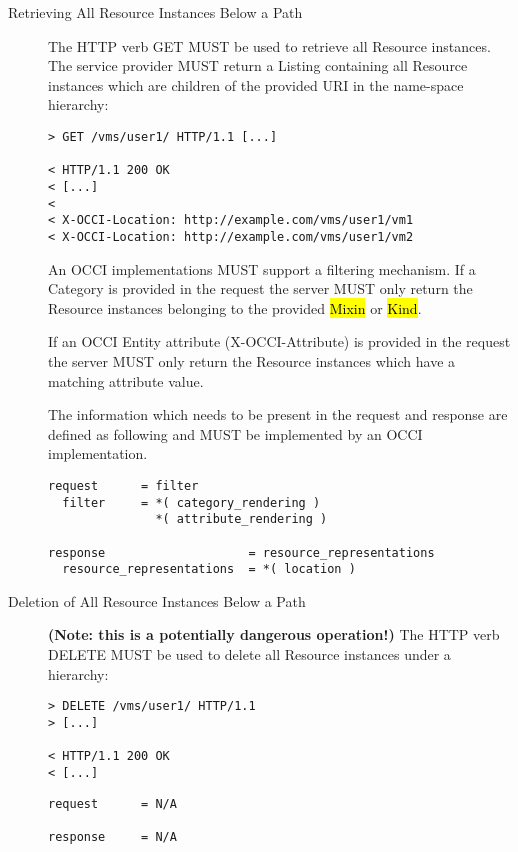 \documentclass[10pt,a4paper]{article}
\begin{document}
\begin{description}
  \item[Retrieving All Resource Instances Below a Path] The HTTP verb
    GET MUST be used to retrieve all Resource instances. The service
    provider MUST return a Listing containing all Resource instances
    which are children of the provided URI in the name-space
    hierarchy:

\begin{verbatim}
> GET /vms/user1/ HTTP/1.1 [...]
 
< HTTP/1.1 200 OK
< [...]
< 
< X-OCCI-Location: http://example.com/vms/user1/vm1
< X-OCCI-Location: http://example.com/vms/user1/vm2
\end{verbatim}

    An OCCI implementations MUST support a filtering mechanism. If a
    Category is provided in the request the server MUST only return
    the Resource instances belonging to the provided \hl{Mixin} or
    \hl{Kind}.

    If an OCCI Entity attribute (X-OCCI-Attribute) is provided in the
    request the server MUST only return the Resource instances which
    have a matching attribute value.

    The information which needs to be present in the request and
    response are defined as following and MUST be implemented by an
    OCCI implementation.

\begin{verbatim}
request      = filter
  filter     = *( category_rendering )
               *( attribute_rendering )

response                    = resource_representations
  resource_representations  = *( location ) 
\end{verbatim}

  \item[Deletion of All Resource Instances Below a Path]
    \textbf{(Note: this is a potentially dangerous operation!)} The
    HTTP verb DELETE MUST be used to delete all Resource instances
    under a hierarchy:
\begin{verbatim}
> DELETE /vms/user1/ HTTP/1.1
> [...]
 
< HTTP/1.1 200 OK
< [...]
\end{verbatim}

\begin{verbatim}
request      = N/A

response     = N/A
\end{verbatim}

\end{description}
\end{document}

